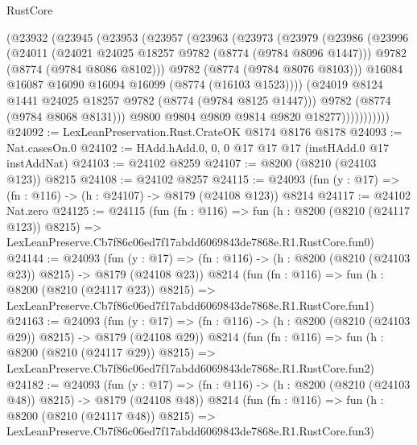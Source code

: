 \begin{lexlean}{RustCore}
\begin{coremodule}
                (@23932
                  (@23945
                    (@23953
                      (@23957
                        (@23963
                          (@23973
                            (@23979
                              (@23986
                                (@23996
                                  (@24011
                                    (@24021 @24025 @18257 @9782 (@8774 (@9784 @8096 @1447)))
                                    @9782
                                    (@8774 (@9784 @8086 @8102)))
                                  @9782
                                  (@8774 (@9784 @8076 @8103)))
                                @16084
                                @16087
                                @16090
                                @16094
                                @16099
                                (@8774 (@16103 @1523))))
                            (@24019 @8124 @1441 @24025 @18257 @9782 (@8774 (@9784 @8125 @1447)))
                            @9782
                            (@8774 (@9784 @8068 @8131)))
                          @9800
                          @9804
                          @9809
                          @9814
                          @9820
                          @18277)))))))))))
@24092 := LexLeanPreservation.Rust.CrateOK @8174 @8176 @8178
@24093 := Nat.casesOn.{0}
@24102 := HAdd.hAdd.{0, 0, 0} @17 @17 @17 (instHAdd.{0} @17 instAddNat)
@24103 := @24102 @8259
@24107 := @8200 (@8210 (@24103 @123)) @8215
@24108 := @24102 @8257
@24115 := @24093 (fun (y : @17) => (fn : @116) -> (h : @24107) -> @8179 (@24108 @123)) @8214
@24117 := @24102 Nat.zero
@24125 := @24115
    (fun (fn : @116) =>
    fun (h : @8200 (@8210 (@24117 @123)) @8215) =>
    LexLeanPreserve.Cb7f86c06ed7f17abdd6069843de7868e.R1.RustCore.fun0)
@24144 := @24093
    (fun (y : @17) => (fn : @116) -> (h : @8200 (@8210 (@24103 @23)) @8215) -> @8179 (@24108 @23))
    @8214
    (fun (fn : @116) =>
    fun (h : @8200 (@8210 (@24117 @23)) @8215) =>
    LexLeanPreserve.Cb7f86c06ed7f17abdd6069843de7868e.R1.RustCore.fun1)
@24163 := @24093
    (fun (y : @17) => (fn : @116) -> (h : @8200 (@8210 (@24103 @29)) @8215) -> @8179 (@24108 @29))
    @8214
    (fun (fn : @116) =>
    fun (h : @8200 (@8210 (@24117 @29)) @8215) =>
    LexLeanPreserve.Cb7f86c06ed7f17abdd6069843de7868e.R1.RustCore.fun2)
@24182 := @24093
    (fun (y : @17) => (fn : @116) -> (h : @8200 (@8210 (@24103 @48)) @8215) -> @8179 (@24108 @48))
    @8214
    (fun (fn : @116) =>
    fun (h : @8200 (@8210 (@24117 @48)) @8215) =>
    LexLeanPreserve.Cb7f86c06ed7f17abdd6069843de7868e.R1.RustCore.fun3)

\end{coremodule}
\end{lexlean}
